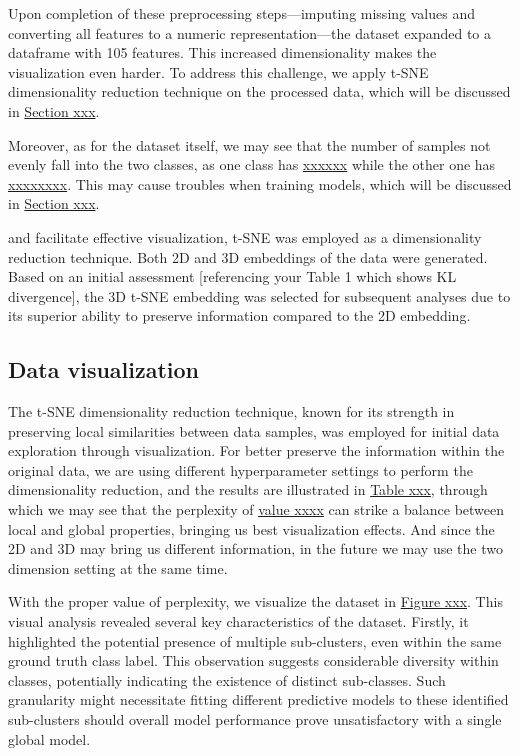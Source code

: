 \documentclass{article}
\begin{document}
Upon completion of these preprocessing steps—imputing missing values and converting all features to a numeric representation—the dataset expanded to a dataframe with 105 features. This increased dimensionality makes the visualization even harder. To address this challenge, we apply t-SNE dimensionality reduction technique on the processed data, which will be discussed in \underline{Section xxx}.

Moreover, as for the dataset itself, we may see that the number of samples not evenly fall into the two classes, as one class has \underline{xxxxxx} while the other one has \underline{xxxxxxxx}. This may cause troubles when training models, which will be discussed in \underline{Section xxx}.

and facilitate effective visualization, t-SNE was employed as a dimensionality reduction technique. Both 2D and 3D embeddings of the data were generated. Based on an initial assessment [referencing your Table 1 which shows KL divergence], the 3D t-SNE embedding was selected for subsequent analyses due to its superior ability to preserve information compared to the 2D embedding.






\subsection{Data visualization}



The t-SNE dimensionality reduction technique, known for its strength in preserving local similarities between data samples, was employed for initial data exploration through visualization. For better preserve the information within the original data, we are using different hyperparameter settings to perform the dimensionality reduction, and the results are illustrated in \underline{Table xxx}, through which we may see that the perplexity of \underline{value xxxx} can strike a balance between local and global properties, bringing us best visualization effects. And since the 2D and 3D may bring us different information, in the future we may use the two dimension setting at the same time.

With the proper value of perplexity, we visualize the dataset in \underline{Figure xxx}. This visual analysis revealed several key characteristics of the dataset. Firstly, it highlighted the potential presence of multiple sub-clusters, even within the same ground truth class label. This observation suggests considerable diversity within classes, potentially indicating the existence of distinct sub-classes. Such granularity might necessitate fitting different predictive models to these identified sub-clusters should overall model performance prove unsatisfactory with a single global model.
\end{document}

